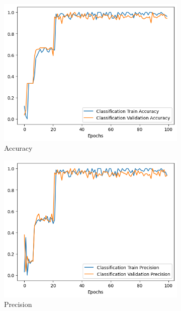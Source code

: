 \begin{figure}[H]
    \centering
    \begin{subfigure}{0.3\textwidth}
        \includegraphics[width=\linewidth]{Images/Acc_IoT.png}
        \caption{Accuracy}
        \label{fig:AccuracyIoT}
    \end{subfigure}
    \hfill
    \begin{subfigure}{0.3\textwidth}
        \includegraphics[width=\linewidth]{Images/Prec_IoT.png}
        \caption{Precision}
        \label{fig:PrecisionIoT}
    \end{subfigure}
    \hfill
    \begin{subfigure}{0.3\textwidth}

\end{subfigure}
\end{figure}
